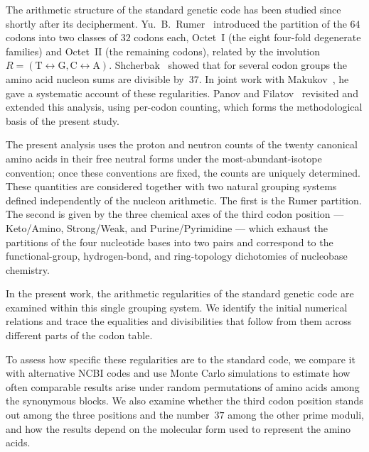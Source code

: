 \documentclass[11pt,a4paper]{article}
\renewcommand{\_}{\origunderscore\allowbreak}
\begin{document}
The arithmetic structure of the standard genetic code has been studied since shortly after its decipherment. Yu.~B.~Rumer~\cite{rumer1966,rumer1968} introduced the partition of the $64$ codons into two classes of $32$ codons each, Octet~I (the eight four-fold degenerate families) and Octet~II (the remaining codons), related by the involution $R = (\mathrm{T} \leftrightarrow \mathrm{G}, \mathrm{C} \leftrightarrow \mathrm{A})$. Shcherbak~\cite{shcherbak1993,shcherbak2003} showed that for several codon
groups the amino acid nucleon sums are divisible by~$37$. In joint work
with Makukov~\cite{makukov2013}, he gave a systematic account of these regularities. Panov and Filatov~\cite{panov2024} revisited and extended this analysis, using per-codon counting, which forms the methodological basis of the present study.

The present analysis uses the proton and neutron counts of the twenty canonical amino acids in their free neutral forms under the most-abundant-isotope convention; once these conventions are fixed, the counts are uniquely determined. These quantities are considered together with two natural grouping systems defined independently of the nucleon arithmetic. The first is the Rumer partition. The second is
given by the three chemical axes of the third codon
position --- Keto/Amino, Strong/Weak, and
Purine/Pyrimidine --- which exhaust the partitions
of the four nucleotide bases into two pairs and
correspond to the functional-group, hydrogen-bond,
and ring-topology dichotomies of nucleobase
chemistry.

In the present work, the arithmetic regularities of
the standard genetic code are examined within this
single grouping system. We identify the initial
numerical relations and trace the equalities and
divisibilities that follow from them across different
parts of the codon table.

To assess how specific these regularities are
to the standard code, we compare it with alternative
NCBI codes and use Monte Carlo simulations to estimate
how often comparable results arise under random
permutations of amino acids among the synonymous
blocks. We also examine whether the third codon
position stands out among the three positions
and the number~$37$ among the other prime moduli,
and how the results depend on the molecular form
used to represent the amino acids.
\end{document}

